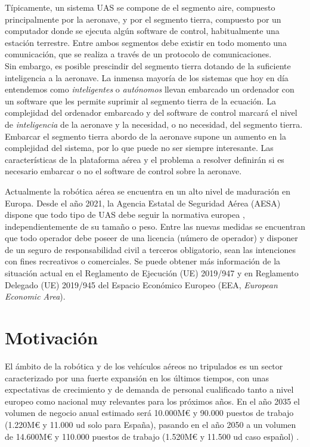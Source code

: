 \documentclass[../main.tex]{subfiles}
\begin{document}
Típicamente, un sistema UAS se compone de el segmento aire, compuesto principalmente por la aeronave, y por el segmento tierra, compuesto por un computador donde se ejecuta algún software de control, habitualmente una estación terrestre. Entre ambos segmentos debe existir en todo momento una comunicación, que se realiza a través de un protocolo de comunicaciones. \\
Sin embargo, es posible prescindir del segmento tierra dotando de la suficiente inteligencia a la aeronave. La inmensa mayoría de los sistemas que hoy en día entendemos como \emph{inteligentes} o \emph{autónomos} llevan embarcado un ordenador con un software que les permite suprimir al segmento tierra de la ecuación. La complejidad del ordenador embarcado y del software de control marcará el nivel de \emph{inteligencia} de la aeronave y la necesidad, o no necesidad, del segmento tierra. \\
Embarcar el segmento tierra abordo de la aeronave supone un aumento en la complejidad del sistema, por lo que puede no ser siempre interesante. Las características de la plataforma aérea y el problema a resolver definirán si es necesario embarcar o no el software de control sobre la aeronave.


Actualmente la robótica aérea se encuentra en un alto nivel de maduración en Europa. Desde el año 2021, la Agencia Estatal de Seguridad Aérea (AESA) dispone que todo tipo de UAS debe seguir la normativa europea \cite{normativa}, independientemente de su tamaño o peso. Entre las nuevas medidas se encuentran que todo operador debe poseer de una licencia (número de operador) y disponer de un seguro de responsabilidad civil a terceros obligatorio, sean las intenciones con fines recreativos o comerciales. Se puede obtener más información de la situación actual en el Reglamento de Ejecución (UE) 2019/947 \cite{regl-ejec} y en Reglamento Delegado (UE) 2019/945 \cite{regl-deleg} del Espacio Económico Europeo (EEA, \emph{European Economic Area}).

\section{Motivación} \label{section:intro-motivacion}
El ámbito de la robótica y de los vehículos aéreos no tripulados es un sector caracterizado por una fuerte expansión en los últimos tiempos, con unas expectativas de crecimiento y de demanda de personal cualificado tanto a nivel europeo como nacional muy relevantes para los próximos años. En el año 2035 el volumen de negocio anual estimado será 10.000M€ y 90.000 puestos de trabajo (1.220M€ y 11.000 ud solo para España), pasando en el año 2050 a un volumen de 14.600M€ y 110.000 puestos de trabajo (1.520M€ y 11.500 ud caso español) \cite{fomento-2018}.
\end{document}
